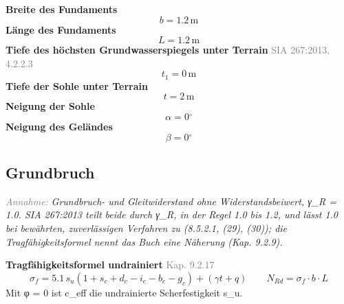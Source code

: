 \documentclass[11pt,a4paper]{article}
\newcommand{\normref}[1]{{\small\textcolor{gray}{#1}}}
\newcommand{\hinweis}[2]{\par\noindent\textcolor{gray}{\textit{#1:}} \textit{#2}\par}
\begin{document}
\noindent\textbf{Breite des Fundaments}
\begin{equation*}
b = 1.2\,\mathrm{m}
\end{equation*}
\noindent\textbf{Länge des Fundaments}
\begin{equation*}
L = 1.2\,\mathrm{m}
\end{equation*}
\noindent\textbf{Tiefe des höchsten Grundwasserspiegels unter Terrain} \hfill \normref{SIA 267:2013, 4.2.2.3}
\begin{equation*}
t_1 = 0\,\mathrm{m}
\end{equation*}
\noindent\textbf{Tiefe der Sohle unter Terrain}
\begin{equation*}
t = 2\,\mathrm{m}
\end{equation*}
\noindent\textbf{Neigung der Sohle}
\begin{equation*}
\alpha = 0{}^{\circ}
\end{equation*}
\noindent\textbf{Neigung des Geländes}
\begin{equation*}
\beta = 0{}^{\circ}
\end{equation*}
\subsection{Grundbruch}
\hinweis{Annahme}{Grundbruch- und Gleitwiderstand ohne Widerstandsbeiwert, γ\_R = 1.0. SIA 267:2013 teilt beide durch γ\_R, in der Regel 1.0 bis 1.2, und lässt 1.0 bei bewährten, zuverlässigen Verfahren zu (8.5.2.1, (29), (30)); die Tragfähigkeitsformel nennt das Buch eine Näherung (Kap. 9.2.9).}
\noindent\textbf{Tragfähigkeitsformel undrainiert} \hfill \normref{Kap. 9.2.17}
\begin{equation*}
\sigma_f = 5.1 \, s_u \left(1 + s_c + d_c - i_c - b_c - g_c\right) + \left(\gamma t + q\right) \qquad N_{Rd} = \sigma_f \cdot b \cdot L
\end{equation*}
Mit φ = 0 ist c\_eff die undrainierte Scherfestigkeit s\_u.
\end{document}
